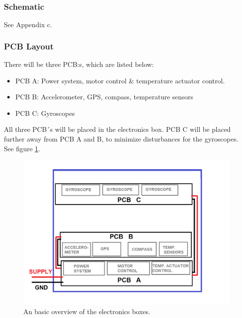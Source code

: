 
\subsubsection{Schematic}
See Appendix c.

\subsubsection{PCB Layout}
There will be three PCB:s, which are listed below:

\begin{itemize}
	\item 	PCB A: Power system, motor control \& temperature actuator control.
	\item	PCB B: Accelerometer, GPS, compass, temperature sensors
	\item 	PCB C: Gyroscopes
\end{itemize}


All three PCB´s will be placed in the electronics box. PCB C will be placed further away from PCB A and B, to minimize disturbances for the gyroscopes. See figure \ref{fig:electronic-box}.

\begin{figure}[H]
	\centering
	\includegraphics[scale=0.5]{4-experiment-design/img/electrical/ElectricalBox.png}
	\caption{An basic overview of the electronics boxes.}
	\label{fig:electronic-box}
\end{figure}


\raggedbottom
